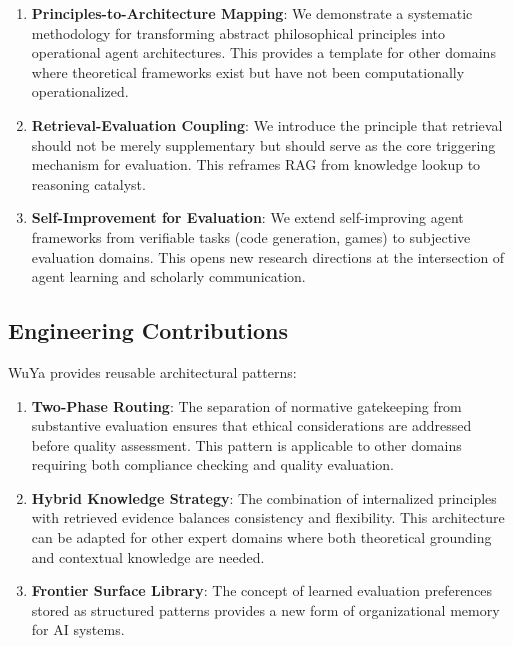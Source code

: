 \documentclass[11pt,a4paper]{article}
\newcommand{\rag}{RAG}
\begin{document}
\begin{enumerate}
    \item \textbf{Principles-to-Architecture Mapping}: We demonstrate a systematic methodology for transforming abstract philosophical principles into operational agent architectures. This provides a template for other domains where theoretical frameworks exist but have not been computationally operationalized.

    \item \textbf{Retrieval-Evaluation Coupling}: We introduce the principle that retrieval should not be merely supplementary but should serve as the core triggering mechanism for evaluation. This reframes \rag{} from knowledge lookup to reasoning catalyst.

    \item \textbf{Self-Improvement for Evaluation}: We extend self-improving agent frameworks from verifiable tasks (code generation, games) to subjective evaluation domains. This opens new research directions at the intersection of agent learning and scholarly communication.
\end{enumerate}

\subsection{Engineering Contributions}

WuYa provides reusable architectural patterns:

\begin{enumerate}
    \item \textbf{Two-Phase Routing}: The separation of normative gatekeeping from substantive evaluation ensures that ethical considerations are addressed before quality assessment. This pattern is applicable to other domains requiring both compliance checking and quality evaluation.

    \item \textbf{Hybrid Knowledge Strategy}: The combination of internalized principles with retrieved evidence balances consistency and flexibility. This architecture can be adapted for other expert domains where both theoretical grounding and contextual knowledge are needed.

    \item \textbf{Frontier Surface Library}: The concept of learned evaluation preferences stored as structured patterns provides a new form of organizational memory for AI systems.
\end{enumerate}
\end{document}
